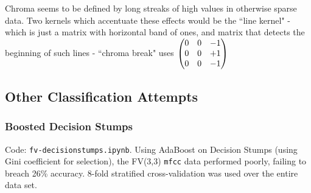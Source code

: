 \documentclass[9pt]{article}
\begin{document}
\begin{figure}[H]
\begin{minipage}[b]{0.3\textwidth}
    \end{minipage}
    
    \label{fig:chromakernels}
\end{figure}

    Chroma seems to be defined by long streaks of high values in otherwise sparse data. Two kernels which accentuate these effects would be the ``line kernel" - which is just a matrix with horizontal band of ones, and matrix that detects the beginning of such lines - ``chroma break" uses $\begin{pmatrix} 0&0&-1\\0&0&+1\\0&0&-1 \end{pmatrix}$

\subsection{Other Classification Attempts}

\subsubsection{Boosted Decision Stumps}\label{boostedstumps}

Code: \texttt{fv-decisionstumps.ipynb}. Using AdaBoost on Decision Stumps (using Gini coefficient for selection), the FV(3,3) \texttt{mfcc} data performed poorly, failing to breach 26\% accuracy. 8-fold stratified cross-validation was used over the entire data set.
\end{document}
